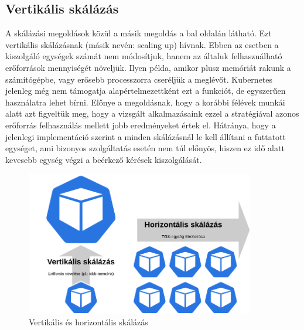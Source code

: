 \subsection{Vertikális skálázás}
A skálázási megoldások közül a másik megoldás a  bal oldalán látható. 
Ezt vertikális skálázásnak (másik nevén: scaling up) hívnak. 
Ebben az esetben a kiszolgáló egységek számát nem módosítjuk, hanem az általuk felhasználható
erőforrások mennyiségét növeljük. Ilyen példa, amikor plusz memóriát rakunk a számítógépbe, vagy
erősebb processzorra cseréljük a meglévőt. Kubernetes jelenleg még nem támogatja alapértelmezettként
ezt a funkciót, de egyszerűen használatra lehet bírni. Előnye a megoldásnak, hogy a korábbi félévek
munkái alatt azt figyeltük meg, hogy a vizsgált alkalmazásaink ezzel a stratégiával azonos erőforrás
felhasználás mellett jobb eredményeket értek el.\citep{bscThesis} Hátránya, hogy a jelenlegi
implementáció szerint a minden skálázásnál le kell állítani a futtatott egységet, ami bizonyos
szolgáltatás esetén nem túl előnyös, hiszen ez idő alatt kevesebb egység végzi a beérkező kérések kiszolgálását.

\begin{figure}[!ht]
\centering
\includegraphics[width=100mm, keepaspectratio]{figures/scaling_types.png}
\caption{Vertikális és horizontális skálázás}
\label{fig:scaling}
\end{figure}

